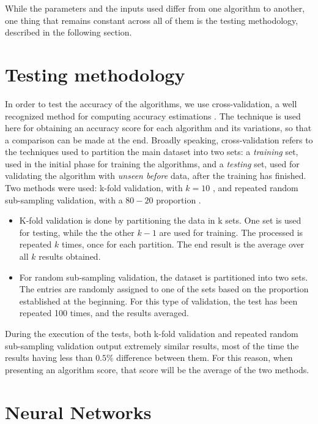 While the parameters and the inputs used differ from one algorithm to another, one thing that remains constant across all of them is the testing methodology, described in the following section.

\section{Testing methodology}

In order to test the accuracy of the algorithms, we use cross-validation, a well recognized method for computing accuracy estimations \cite{kohavi1995study}. The technique is used here for obtaining an accuracy score for each algorithm and its variations, so that a comparison can be made at the end. Broadly speaking, cross-validation refers to the techniques used to partition the main dataset into two sets: a \textit{training} set, used in the initial phase for training the algorithms, and a \textit{testing} set, used for validating the algorithm with \textit{unseen before} data, after the training has finished. Two methods were used: k-fold validation, with $k = 10$ \cite{kohavi1995study}, and repeated random sub-sampling validation, with a $80-20$ proportion \cite{segaran}. 

\begin{itemize}
  \item K-fold validation is done by partitioning the data in k sets. One set is used for testing, while the the other $k-1$ are used for training. The processed is repeated $k$ times, once for each partition. The end result is the average over all $k$ results obtained. 
  \item For random sub-sampling validation, the dataset is partitioned into two sets. The entries are randomly assigned to one of the sets based on the proportion established at the beginning. For this type of validation, the test has been repeated 100 times, and the results averaged.   
\end{itemize}

During the execution of the tests, both k-fold validation and repeated random sub-sampling validation output extremely similar results, most of the time the results having less than $0.5\%$ difference between them. For this reason, when presenting an algorithm score, that score will be the average of the two methods. 


\section{Neural Networks}

